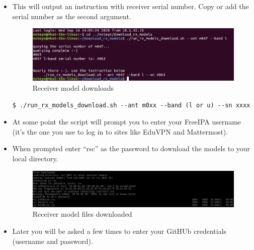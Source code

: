 \begin{itemize}
\begin{lstlisting}[style=DOS]
\end{lstlisting}


\item This will output an instruction with receiver serial number. Copy or add the serial number as the second argument.


\begin{figure}[!thb]
	\centering
	\includegraphics[scale=0.5]{Chapters/images/image89.png}
	
	\caption{Receiver model downloads}
	\label{fig:image89}
\end{figure}

\begin{lstlisting}[style=DOS]
$ ./run_rx_models_download.sh --ant m0xx --band (l or u) --sn xxxx

\end{lstlisting}


\item At some point the script will prompt you to enter your FreeIPA username (it’s the one you use to log in to sites like EduVPN and Mattermost).



\item When prompted enter “rsc” as the password to download the models to your local directory.

\begin{figure}[!thb]
	\centering
	\includegraphics[scale=0.5]{Chapters/images/image25.png}
	
	\caption{Receiver model files downloaded}
	\label{fig:image25}
\end{figure}

\item Later you will be asked a few times to enter your GitHUb credentials (username and password).


\end{itemize}
